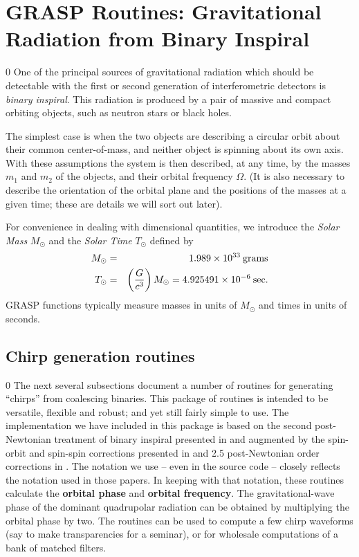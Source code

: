 \section{GRASP Routines: Gravitational Radiation from Binary Inspiral}
\label{s:inspiral}
\setcounter{equation}0
One of the principal sources of gravitational radiation which should be
detectable with the first or second generation of interferometric
detectors is {\it binary inspiral}.  This radiation is produced by a
pair of massive and compact orbiting objects, such as neutron stars or
black holes.

The simplest case is when the two objects are describing a circular
orbit about their common center-of-mass, and neither object is spinning
about its own axis.  With these assumptions the system is then
described, at any time, by the masses $m_1$ and $m_2$ of the objects,
and their orbital frequency $\Omega$.  (It is also necessary to
describe the orientation of the orbital plane and the positions of the
masses at a given time; these are details we will sort out later).

For convenience in dealing with dimensional quantities, we introduce
the {\it Solar Mass} $M_\odot$ and the {\it Solar Time} $T_\odot$
defined by
\begin{eqnarray}
M_\odot &=& 1.989 \times 10^{33} \> {\rm grams}\\
\label{e:tsolar}
T_\odot &=& \left( {G \over c^3} \right) M_\odot = 4.925491 \times
10^{-6} \> {\rm sec}.
\end{eqnarray}
GRASP functions typically measure masses in units of $M_\odot$ and
times in units of seconds.
\clearpage

\subsection{Chirp generation routines}
\setcounter{equation}0
The next several subsections document a number of routines 
for generating ``chirps'' from coalescing binaries.  
This package of routines is intended to be versatile, flexible and robust; 
and yet still fairly simple to use.
The implementation we have included in this package is based
on the second post-Newtonian treatment of binary inspiral presented in
\cite{biww} and augmented by the spin-orbit and spin-spin corrections
presented in \cite{willwiseman} and 2.5 post-Newtonian
order corrections in \cite{blanchet:1996}.
The notation we use -- even in the source code  --
closely reflects the notation used in those papers.
In keeping with that notation, these routines calculate
the {\bf orbital phase} and {\bf orbital frequency}. 
The gravitational-wave phase of the dominant quadrupolar radiation
can be obtained by multiplying the orbital phase by two.
The routines can be used to compute a few 
chirp waveforms (say to make transparencies for a seminar),
or for wholesale computations of a bank of matched filters.

